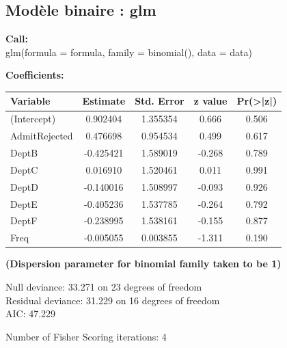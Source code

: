 \documentclass[10pt,french]{report}
\begin{document}
    \subsection{Modèle binaire : glm}

    \begin{flushleft}
    \textbf{Call:} \\
    glm(formula = formula, family = binomial(), data = data)
    \end{flushleft}

    \begin{flushleft}
    \textbf{Coefficients:}
    \end{flushleft}

    \begin{longtable}{lcccc}
    \hline
    \textbf{Variable} & \textbf{Estimate} & \textbf{Std. Error} & \textbf{z value} & \textbf{Pr(>|z|)} \\
    \hline
    \endfirsthead
    \hline
    (Intercept) & 0.902404 & 1.355354 & 0.666 & 0.506 \\
    AdmitRejected & 0.476698 & 0.954534 & 0.499 & 0.617 \\
    DeptB & -0.425421 & 1.589019 & -0.268 & 0.789 \\
    DeptC & 0.016910 & 1.520461 & 0.011 & 0.991 \\
    DeptD & -0.140016 & 1.508997 & -0.093 & 0.926 \\
    DeptE & -0.405236 & 1.537785 & -0.264 & 0.792 \\
    DeptF & -0.238995 & 1.538161 & -0.155 & 0.877 \\
    Freq & -0.005055 & 0.003855 & -1.311 & 0.190 \\
    \hline
    \end{longtable}

    \begin{flushleft}
    \textbf{(Dispersion parameter for binomial family taken to be 1)}
    \end{flushleft}

    \begin{flushleft}
        Null deviance: 33.271 on 23 degrees of freedom \\
    Residual deviance: 31.229 on 16 degrees of freedom \\
    AIC: 47.229
    \end{flushleft}

    \begin{flushleft}
    Number of Fisher Scoring iterations: 4
    \end{flushleft}
\end{document}
